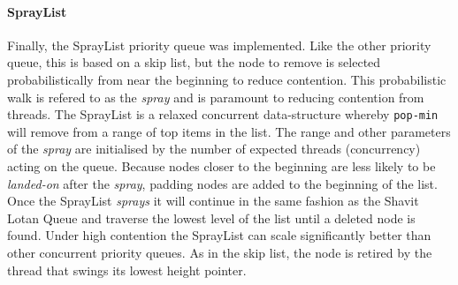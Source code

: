 \paragraph{SprayList} Finally, the SprayList priority queue was implemented. \cite{SprayList} Like the other priority queue, this is based on a skip list, but the node to remove is selected probabilistically from near the beginning to reduce contention. This probabilistic walk is refered to as the \textit{spray} and is paramount to reducing contention from threads. The SprayList is a relaxed concurrent data-structure whereby \texttt{pop-min} will remove from a range of top items in the list. The range and other parameters of the \textit{spray} are initialised by the number of expected threads (concurrency) acting on the queue. Because nodes closer to the beginning are less likely to be \textit{landed-on} after the \textit{spray}, padding nodes are added to the beginning of the list. Once the SprayList \textit{sprays} it will continue in the same fashion as the Shavit Lotan Queue and traverse the lowest level of the list until a deleted node is found. Under high contention the SprayList can scale significantly better than other concurrent priority queues. As in the skip list, the node is retired by the thread that swings its lowest height pointer.